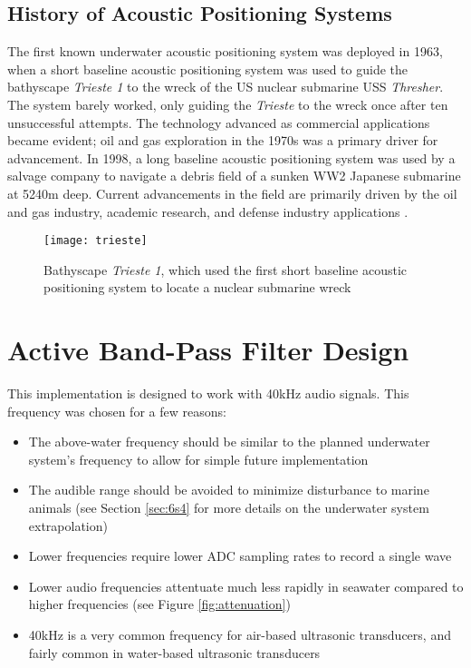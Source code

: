 \documentclass[12pt,a4paper]{report}
\begin{document}
\subsection{History of Acoustic Positioning Systems} \label{ssec:3s1s1}
The first known underwater acoustic positioning system was deployed in 1963, when a short baseline acoustic positioning system was used to guide the bathyscape \emph{Trieste 1} to the wreck of the US nuclear submarine USS \emph{Thresher}. The system barely worked, only guiding the \textit{Trieste} to the wreck once after ten unsuccessful attempts. The technology advanced as commercial applications became evident; oil and gas exploration in the 1970s was a primary driver for advancement. In 1998, a long baseline acoustic positioning system was used by a salvage company to navigate a debris field of a sunken WW2 Japanese submarine at 5240m deep. Current advancements in the field are primarily driven by the oil and gas industry, academic research, and defense industry applications \cite{apomab}.

\begin{figure}[htbp]
	\centering
	\texttt{[image: trieste]}
	\caption{Bathyscape \textit{Trieste 1}, which used the first short baseline acoustic positioning system to locate a nuclear submarine wreck \cite{apomab}}
	\label{fig:trieste}
\end{figure}

\section{Active Band-Pass Filter Design} \label{sec:3s4}
This implementation is designed to work with 40kHz audio signals. This frequency was chosen for a few reasons:
\begin{itemize}[noitemsep,topsep=0pt,]
	\item The above-water frequency should be similar to the planned underwater system’s frequency to allow for simple future implementation
	\item The audible range should be avoided to minimize disturbance to marine animals (see Section \ref{sec:6s4} for more details on the underwater system extrapolation)
	\item Lower frequencies require lower ADC sampling rates to record a single wave
	\item Lower audio frequencies attentuate much less rapidly in seawater compared to higher frequencies (see Figure \ref{fig:attenuation})
	\item 40kHz is a very common frequency for air-based ultrasonic transducers, and fairly common in water-based ultrasonic transducers
\end{itemize}
\end{document}

